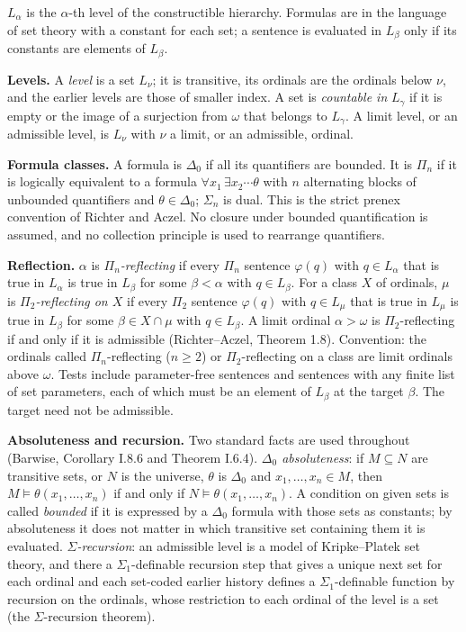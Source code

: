 \documentclass[11pt]{article}
\begin{document}
$L_{\alpha}$ is the $\alpha$-th level of the constructible hierarchy. Formulas are in the language of set theory with a
constant for each set; a sentence is evaluated in $L_{\beta}$ only if its constants are elements of $L_{\beta}$.

\textbf{Levels.} A \emph{level} is a set $L_{\nu}$; it is transitive, its ordinals are the ordinals below $\nu$, and
the earlier levels are those of smaller index. A set is \emph{countable in} $L_{\gamma}$ if it is empty or the image
of a surjection from $\omega$ that belongs to $L_{\gamma}$. A limit level, or an admissible level, is $L_{\nu}$ with $\nu$ a limit, or an admissible,
ordinal.

\textbf{Formula classes.} A formula is $\Delta_0$ if all its quantifiers are bounded. It is $\Pi_n$ if it is logically
equivalent to a formula $\forall x_1\, \exists x_2 \cdots \theta$ with $n$ alternating blocks of unbounded quantifiers
and $\theta \in \Delta_0$; $\Sigma_n$ is dual. This is the strict prenex convention of Richter and Aczel. No closure
under bounded quantification is assumed, and no collection principle is used to rearrange quantifiers.

\textbf{Reflection.} $\alpha$ is \emph{$\Pi_n$-reflecting} if every $\Pi_n$ sentence $\varphi(q)$ with
$q \in L_{\alpha}$ that is true in $L_{\alpha}$ is true in $L_{\beta}$ for some $\beta < \alpha$ with $q \in L_{\beta}$.
For a class $X$ of ordinals, $\mu$ is \emph{$\Pi_2$-reflecting on $X$} if every $\Pi_2$ sentence $\varphi(q)$ with
$q \in L_{\mu}$ that is true in $L_{\mu}$ is true in $L_{\beta}$ for some $\beta \in X \cap \mu$ with $q \in L_{\beta}$. A
limit ordinal $\alpha > \omega$ is $\Pi_2$-reflecting if and only if it is admissible (Richter--Aczel, Theorem 1.8).
Convention: the ordinals called $\Pi_n$-reflecting ($n \ge 2$) or $\Pi_2$-reflecting on a class are limit ordinals
above $\omega$. Tests include parameter-free sentences and sentences with any finite list of set parameters, each of
which must be an element of $L_{\beta}$ at the target $\beta$. The target need not be admissible.

\textbf{Absoluteness and recursion.} Two standard facts are used throughout (Barwise, Corollary I.8.6 and Theorem I.6.4). \emph{$\Delta_0$
absoluteness}: if $M \subseteq N$ are transitive sets, or $N$ is the universe, $\theta$ is $\Delta_0$ and
$x_1, \dots, x_n \in M$, then $M \models \theta(x_1, \dots, x_n)$ if and only if $N \models \theta(x_1, \dots, x_n)$.
A condition on given sets is called \emph{bounded} if it is expressed by a $\Delta_0$ formula with those sets as
constants; by absoluteness it does not matter in which transitive set containing them it is evaluated.
\emph{$\Sigma$-recursion}: an admissible level is a model of Kripke--Platek set theory, and there a
$\Sigma_1$-definable recursion step that gives a unique next set for each ordinal and each set-coded earlier history
defines a $\Sigma_1$-definable function by recursion on the ordinals, whose restriction to each ordinal of the level
is a set (the $\Sigma$-recursion theorem).
\end{document}
